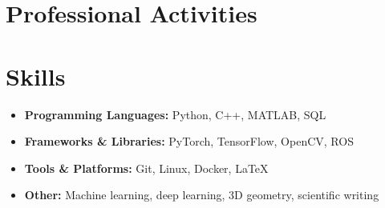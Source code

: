 \documentclass[10pt, a4paper]{article}
\begin{document}
\section{Professional Activities}

\vspace{3pt}
\begin{itemize}[leftmargin=1.4em, topsep=0pt, itemsep=1pt, parsep=0pt]
\end{itemize}

\section{Skills}
\vspace{3pt}
\small
\begin{itemize}[leftmargin=1.4em, topsep=1pt, itemsep=0pt, parsep=0pt]
    \item {\bf Programming Languages:} Python, C++, MATLAB, SQL
    \item {\bf Frameworks \& Libraries:} PyTorch, TensorFlow, OpenCV, ROS
    \item {\bf Tools \& Platforms:} Git, Linux, Docker, LaTeX
    \item {\bf Other:} Machine learning, deep learning, 3D geometry, scientific writing
\end{itemize}
\end{document}

